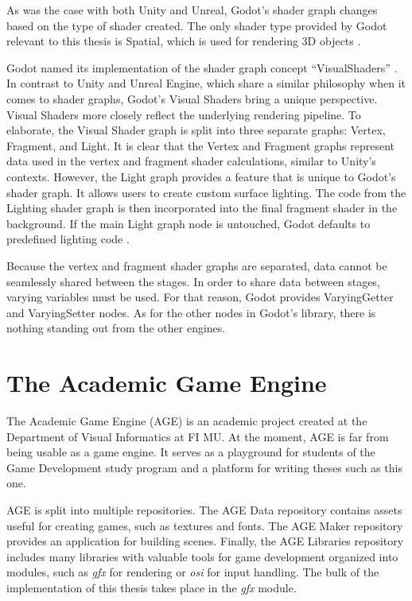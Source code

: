 \documentclass[
  digital,     %
  oneside,     %
  nosansbold,  %
  nocolorbold, %
  lof,         %
  lot,         %
]{fithesis4}
\begin{document}
As was the case with both Unity and Unreal, Godot's shader graph changes based on the type of shader created.
The only shader type provided by Godot relevant to this thesis is Spatial, which is used for rendering 3D objects
\cite{godot-spatial-shaders}.

Godot named its implementation of the shader graph concept \enquote{VisualShaders} \cite{godot-visual-shaders}.
In contrast to Unity and Unreal Engine, which share a similar philosophy when it comes to shader graphs,
Godot's Visual Shaders bring a unique perspective. Visual Shaders more closely reflect the underlying
rendering pipeline. To elaborate, the Visual Shader graph is split into three separate graphs:
Vertex, Fragment, and Light. It is clear that the Vertex and Fragment graphs represent data used in the vertex
and fragment shader calculations, similar to Unity's contexts.
However, the Light graph provides a feature that is unique to Godot's shader graph.
It allows users to create custom surface lighting. The code from the Lighting shader graph is then incorporated
into the final fragment shader in the background. If the main Light graph node is untouched,
Godot defaults to predefined lighting code \cite{godot-shaders-intro}.

Because the vertex and fragment shader graphs are separated, data cannot be seamlessly shared between the stages.
In order to share data between stages, varying variables must be used. For that reason, Godot provides
VaryingGetter and VaryingSetter nodes. As for the other nodes in Godot's library, there is nothing standing
out from the other engines.

\chapter{The Academic Game Engine}
The Academic Game Engine (AGE) is an academic project created at the Department of Visual Informatics
at FI MU. At the moment, AGE is far from being usable as a game engine. It serves as a playground for students
of the Game Development study program and a platform for writing theses such as this one.

AGE is split into multiple repositories.
The AGE Data repository contains assets useful for creating games, such as textures and fonts.
The AGE Maker repository provides an application for building scenes. Finally, the AGE Libraries
repository includes many libraries with valuable tools for game development organized into modules,
such as \textit{gfx} for rendering or \textit{osi} for input handling.
The bulk of the implementation of this thesis takes place in the \textit{gfx} module.
\end{document}
